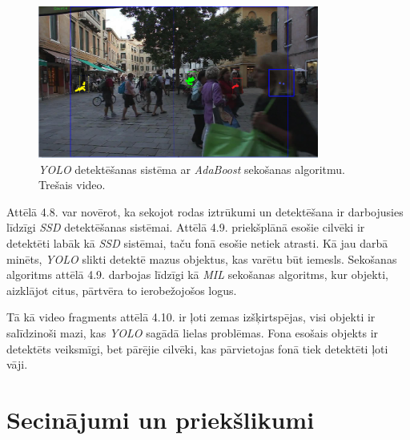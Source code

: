 \begin{figure}[H]%
	\centering
	\includegraphics[height=5cm]{images/yolo3.png} %
	\caption{\textit{YOLO} detektēšanas sistēma ar \textit{AdaBoost} sekošanas algoritmu. Trešais video.}%
	\label{fig:example}%
\end{figure}
\newpage
Attēlā 4.8. var novērot, ka sekojot rodas iztrūkumi un detektēšana ir darbojusies līdzīgi \textit{SSD} detektēšanas sistēmai. Attēlā 4.9. priekšplānā esošie cilvēki ir detektēti labāk kā \textit{SSD} sistēmai, taču fonā esošie netiek atrasti. Kā jau darbā minēts, \textit{YOLO} slikti detektē mazus objektus, kas varētu būt iemesls. Sekošanas algoritms attēlā 4.9. darbojas līdzīgi kā \textit{MIL} sekošanas algoritms, kur objekti, aizklājot citus, pārtvēra to ierobežojošos logus. 

Tā kā video fragments attēlā 4.10. ir ļoti zemas izšķirtspējas, visi objekti ir salīdzinoši mazi, kas \textit{YOLO} sagādā lielas problēmas. Fona esošais objekts ir detektēts veiksmīgi, bet pārējie cilvēki, kas pārvietojas fonā tiek detektēti ļoti vāji.
\chapter{Secinājumi un priekšlikumi}
